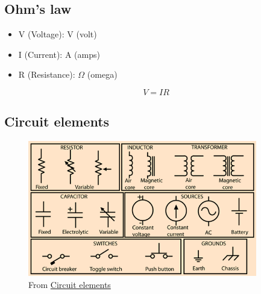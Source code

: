 \subsection{Ohm's law}
\begin{itemize}
  \item V (Voltage): V (volt)
  \item I (Current): A (amps)
  \item R (Resistance): $\Omega$ (omega)
\end{itemize}

\begin{equation} V = IR \end{equation}


\subsection{Circuit elements}
\begin{figure}[h]
    \vspace{10mm}
    \centering
    \includegraphics[width=10cm]{image/circuit-elements.png}
    \caption{From \cite{} \href{http://hyperphysics.phy-astr.gsu.edu/hbasees/Electronic/cktelcon.html}{Circuit elements}}
\end{figure}



